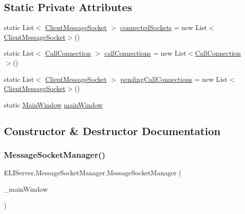 \subsection*{Static Private Attributes}
\begin{DoxyCompactItemize}
\item 
static List$<$ \hyperlink{class_e_l_i_server_1_1_messaging_1_1_client_message_socket}{Client\+Message\+Socket} $>$ \hyperlink{class_e_l_i_server_1_1_message_socket_manager_a042e9dc087484feacc3128eb3f7ac2f4}{connected\+Sockets} = new List$<$\hyperlink{class_e_l_i_server_1_1_messaging_1_1_client_message_socket}{Client\+Message\+Socket}$>$()
\item 
static List$<$ \hyperlink{class_e_l_i_server_1_1_call_connection}{Call\+Connection} $>$ \hyperlink{class_e_l_i_server_1_1_message_socket_manager_a1f25b676369fa4e59beca49d3ecf294a}{call\+Connections} = new List$<$\hyperlink{class_e_l_i_server_1_1_call_connection}{Call\+Connection}$>$()
\item 
static List$<$ \hyperlink{class_e_l_i_server_1_1_messaging_1_1_client_message_socket}{Client\+Message\+Socket} $>$ \hyperlink{class_e_l_i_server_1_1_message_socket_manager_ad34ae3d8801eea0c2fd2305c5b05e692}{pending\+Call\+Connections} = new List$<$\hyperlink{class_e_l_i_server_1_1_messaging_1_1_client_message_socket}{Client\+Message\+Socket}$>$()
\item 
static \hyperlink{class_e_l_i_server_1_1_main_window}{Main\+Window} \hyperlink{class_e_l_i_server_1_1_message_socket_manager_a937d0802b2bb8f1e173a17ee27e3b8cc}{main\+Window}
\end{DoxyCompactItemize}


\subsection{Constructor \& Destructor Documentation}
\mbox{\label{class_e_l_i_server_1_1_message_socket_manager_a28b6d0e215aa417970fc82b9239bebbb}} 
\subsubsection{\texorpdfstring{Message\+Socket\+Manager()}{MessageSocketManager()}}
{\footnotesize\ttfamily E\+L\+I\+Server.\+Message\+Socket\+Manager.\+Message\+Socket\+Manager (\begin{DoxyParamCaption}\item[{\hyperlink{class_e_l_i_server_1_1_main_window}{Main\+Window}}]{\+\_\+main\+Window }\end{DoxyParamCaption})\hspace{0.3cm}{\ttfamily [inline]}}




